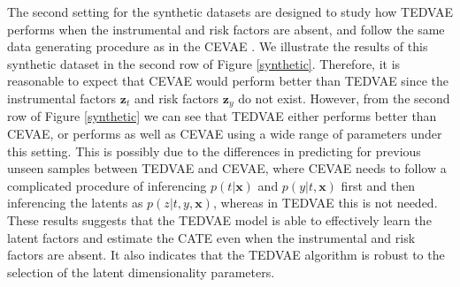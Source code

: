 \documentclass[letterpaper]{article} %
\begin{document}
The second setting for the synthetic datasets are designed to study how TEDVAE performs when the instrumental and risk factors are absent, and follow the same data generating procedure as in the CEVAE \cite{Louizos2017}.
We illustrate the results of this synthetic dataset in the second row of Figure \ref{synthetic}. Therefore, it is reasonable to expect that CEVAE would perform better than TEDVAE since the instrumental factors $\mathbf{z}_t$ and risk factors $\mathbf{z}_y$ do not exist.
However, from the second row of Figure \ref{synthetic} we can see that TEDVAE either performs better than  CEVAE, or performs as well as CEVAE using a wide range of parameters under this setting. 
This is possibly due to the differences in predicting for previous unseen samples between TEDVAE and CEVAE, where CEVAE needs to follow a complicated procedure of inferencing $p(t|\mathbf{x})$ and $p(y|t,\mathbf{x})$ first and then inferencing the latents as $p(z|t,y,\mathbf{x})$, whereas in TEDVAE this is not needed.
These results suggests that the TEDVAE model is able to effectively learn the latent factors and estimate the CATE even when the instrumental and risk factors are absent. It also indicates that the TEDVAE algorithm is robust to the selection of the latent dimensionality parameters. 	
\end{document}
